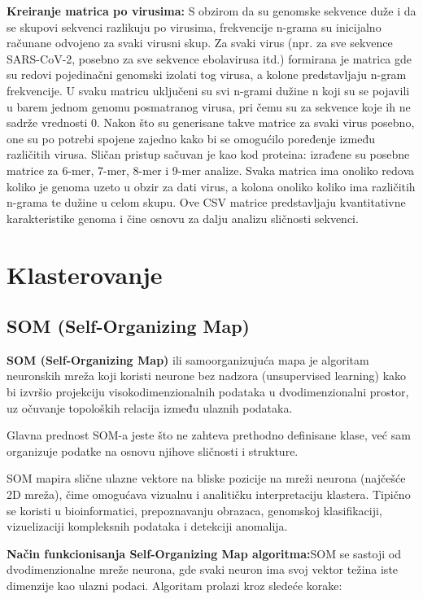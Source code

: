 \documentclass[a4paper,12pt]{article}
\begin{document}
\vspace{10pt}
\textbf{Kreiranje matrica po virusima:} S obzirom da su genomske sekvence duže i da se skupovi sekvenci
razlikuju po virusima, frekvencije n-grama su inicijalno računane odvojeno za svaki virusni skup. Za svaki virus
(npr. za sve sekvence SARS-CoV-2, posebno za sve sekvence ebolavirusa itd.) formirana je matrica gde su
redovi pojedinačni genomski izolati tog virusa, a kolone predstavljaju n-gram frekvencije. U svaku matricu
uključeni su svi n-grami dužine n koji su se pojavili u barem jednom genomu posmatranog virusa, pri čemu
su za sekvence koje ih ne sadrže vrednosti 0. Nakon što su generisane takve matrice za svaki virus posebno,
one su po potrebi spojene zajedno kako bi se omogućilo poređenje između različitih virusa.
Sličan pristup sačuvan je kao kod proteina: izrađene su posebne matrice za 6-mer, 7-mer, 8-mer i 9-mer
analize. Svaka matrica ima onoliko redova koliko je genoma uzeto u obzir za dati virus, a kolona onoliko
koliko ima različitih n-grama te dužine u celom skupu. Ove CSV matrice predstavljaju kvantitativne
karakteristike genoma i čine osnovu za dalju analizu sličnosti sekvenci.


\newpage
\section{Klasterovanje}

\subsection{SOM (Self-Organizing Map)}
\textbf{SOM (Self-Organizing Map)} ili samoorganizujuća mapa je algoritam neuronskih mreža koji koristi neurone bez nadzora (unsupervised learning) kako bi izvršio projekciju visokodimenzionalnih podataka u dvodimenzionalni prostor, uz očuvanje topoloških relacija između ulaznih podataka.

Glavna prednost SOM-a jeste što ne zahteva prethodno definisane klase, već sam organizuje podatke na osnovu njihove sličnosti i strukture.

SOM mapira slične ulazne vektore na bliske pozicije na mreži neurona (najčešće 2D mreža), čime omogućava vizualnu i analitičku interpretaciju klastera. Tipično se koristi u bioinformatici, prepoznavanju obrazaca, genomskoj klasifikaciji, vizuelizaciji kompleksnih podataka i detekciji anomalija.

\textbf{Način funkcionisanja Self-Organizing Map algoritma:}SOM se sastoji od dvodimenzionalne mreže neurona, gde svaki neuron ima svoj vektor težina iste dimenzije kao ulazni podaci. Algoritam prolazi kroz sledeće korake:
\end{document}
